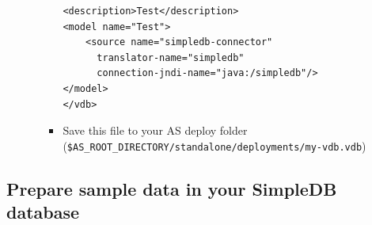 \documentclass[oneside,12pt,final]{fithesis2}
\begin{document}
\begin{enumerate}
\begin{itemize}
\begin{itemize}
\begin{Verbatim}[fontsize=\small]
<description>Test</description>
<model name="Test">
    <source name="simpledb-connector" 
	  translator-name="simpledb" 
	  connection-jndi-name="java:/simpledb"/>
</model>
</vdb>   
  \end{Verbatim}
 \item Save this file to your AS deploy folder (\texttt{\$AS\_ROOT\_DIRECTORY/\allowbreak standalone/deployments/my-vdb.vdb})
 \end{itemize}

 \end{itemize}

\end{enumerate}
\subsection*{Prepare sample data in your SimpleDB database}
\end{document}
